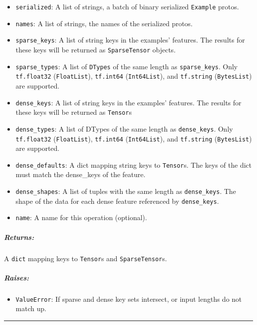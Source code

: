 \begin{itemize}
\tightlist
\item
  \texttt{serialized}: A list of strings, a batch of binary serialized
  \texttt{Example} protos.
\item
  \texttt{names}: A list of strings, the names of the serialized protos.
\item
  \texttt{sparse\_keys}: A list of string keys in the examples'
  features. The results for these keys will be returned as
  \texttt{SparseTensor} objects.
\item
  \texttt{sparse\_types}: A list of \texttt{DTypes} of the same length
  as \texttt{sparse\_keys}. Only \texttt{tf.float32}
  (\texttt{FloatList}), \texttt{tf.int64} (\texttt{Int64List}), and
  \texttt{tf.string} (\texttt{BytesList}) are supported.
\item
  \texttt{dense\_keys}: A list of string keys in the examples' features.
  The results for these keys will be returned as \texttt{Tensor}s
\item
  \texttt{dense\_types}: A list of DTypes of the same length as
  \texttt{dense\_keys}. Only \texttt{tf.float32} (\texttt{FloatList}),
  \texttt{tf.int64} (\texttt{Int64List}), and \texttt{tf.string}
  (\texttt{BytesList}) are supported.
\item
  \texttt{dense\_defaults}: A dict mapping string keys to
  \texttt{Tensor}s. The keys of the dict must match the dense\_keys of
  the feature.
\item
  \texttt{dense\_shapes}: A list of tuples with the same length as
  \texttt{dense\_keys}. The shape of the data for each dense feature
  referenced by \texttt{dense\_keys}.
\item
  \texttt{name}: A name for this operation (optional).
\end{itemize}

\subparagraph{Returns: }\label{returns-39}

A \texttt{dict} mapping keys to \texttt{Tensor}s and
\texttt{SparseTensor}s.

\subparagraph{Raises: }\label{raises}

\begin{itemize}
\tightlist
\item
  \texttt{ValueError}: If sparse and dense key sets intersect, or input
  lengths do not match up.
\end{itemize}

\begin{center}\rule{0.5\linewidth}{\linethickness}\end{center}

